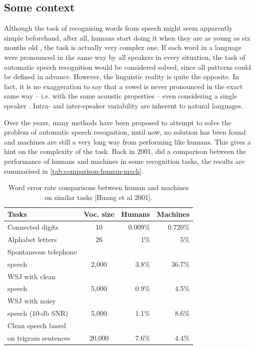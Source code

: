 \subsection{Some context}

Although the task of recognising words from speech might seem apparently simple beforehand, after all, humans start doing it when they are as young as six months old \cite{Bergelson2012}, the task is actually very complex one. If each word in a language were pronounced in the same way by all speakers in every situation, the task of automatic speech recognition would be considered solved, since all patterns could be defined in advance. However, the linguistic reality is quite the opposite. In fact, it is no exaggeration to say that a vowel is never pronounced in the exact same way -- i.e. with the same acoustic properties -- even considering a single speaker \cite{Johnson2004}. Intra- and inter-speaker variability are inherent to natural languages.

Over the years, many methods have been 
proposed to attempt to solve the problem of automatic speech recognition, until now, no solution has been found and machines are still
a very long way from performing like humans. This gives a hint on the complexity of the task. Back in 2001, \citet{Huang2001} did a comparison between the performance of humans and machines in some recognition tasks, the results are summarised in \autoref{tab:comparison-human-mach}.

\begin{table}[!ht]
  \caption{Word error rate comparisons between human and machines on similar tasks [Huang et al 2001].}
  \smallskip
  \centering
  \begin{tabular}{lcrr} \toprule
      \textbf{Tasks} & \textbf{Voc. size} & \textbf{Humans} & \textbf{Machines} \\ \midrule
      \small Connected digits & 10 & 0.009\% & 0.720\% \\
      \small Alphabet letters & 26 & 1\% & 5\% \\
      \small Spontaneous telephone \\ speech & 2,000 & 3.8\% & 36.7\% \\
      \small WSJ with clean \\ \small speech & 5,000 & 0.9\% & 4.5\% \\
      \small WSJ with noisy \\ \small speech (10-db SNR) & 5,000 & 1.1\% & 8.6\% \\
      \small Clean speech based \\ \small on trigram sentences & 20,000 & 7.6\% & 4.4\% \\
    \bottomrule
  \end{tabular}
  \label{tab:comparison-human-mach}
\end{table}

